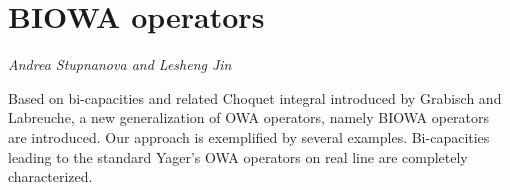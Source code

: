 \documentclass[../booklet.tex]{subfiles}
\begin{document}
\section[BIOWA operators. {\it Andrea Stupnanova and Lesheng Jin}]{BIOWA operators}
 

\begin{center}
  {\it Andrea Stupnanova and Lesheng Jin}
\end{center}

\vskip 0.8cm


Based on bi-capacities and related Choquet integral introduced by Grabisch and Labreuche, a new generalization of OWA operators, namely BIOWA operators are introduced. Our approach is exemplified by several examples. Bi-capacities leading to the standard Yager's OWA operators on real line are completely characterized.
\\
\end{document}
